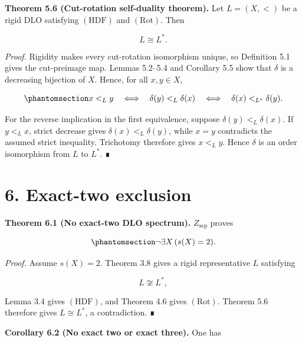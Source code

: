 \documentclass[
  english,
  11pt,
  reqno]{amsart}
\begin{document}
\protect{}\label{thm:5-6-cut-rotation-selfduality}

\textbf{Theorem 5.6 (Cut-rotation self-duality theorem).} Let
\(L=(X,<)\) be a rigid DLO satisfying \((\mathrm{HDF})\) and
\((\mathrm{Rot})\). Then

\[
L\cong L^*.
\]

\emph{Proof.} Rigidity makes every cut-rotation isomorphism unique, so
Definition 5.1 gives the cut-preimage map. Lemmas 5.2--5.4 and Corollary
5.5 show that \(\delta\) is a decreasing bijection of \(X\). Hence, for
all \(x,y\in X\),

\begin{equation}\protect\phantomsection\label{eq:delta-anti-isomorphism}{
x<_L y
\quad\Longleftrightarrow\quad
\delta(y)<_L\delta(x)
\quad\Longleftrightarrow\quad
\delta(x)<_{L^*}\delta(y).
}\end{equation}

For the reverse implication in the first equivalence, suppose
\(\delta(y)<_L\delta(x)\). If \(y<_Lx\), strict decrease gives
\(\delta(x)<_L\delta(y)\), while \(x=y\) contradicts the assumed strict
inequality. Trichotomy therefore gives \(x<_Ly\). Hence \(\delta\) is an
order isomorphism from \(L\) to \(L^*\). ∎

\protect{}\label{sec:main-theorem}

\section{6. Exact-two exclusion}\label{exact-two-exclusion}

\protect{}\label{thm:6-1-main}

\textbf{Theorem 6.1 (No exact-two DLO spectrum).} \(Z_{\mathrm{sep}}\)
proves

\begin{equation}\protect\phantomsection\label{eq:main-theorem}{
\neg\exists X\,(s(X)=2).
}\end{equation}

\emph{Proof.} Assume \(s(X)=2\). Theorem 3.8 gives a rigid
representative \(L\) satisfying

\[
L\not\cong L^*,
\]

Lemma 3.4 gives \((\mathrm{HDF})\), and Theorem 4.6 gives
\((\mathrm{Rot})\). Theorem 5.6 therefore gives \(L\cong L^*\), a
contradiction. ∎

\protect{}\label{cor:6-2-two-three-gap}

\textbf{Corollary 6.2 (No exact two or exact three).} One has
\end{document}
